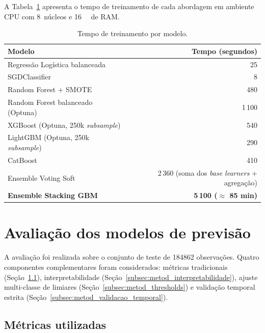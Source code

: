 A Tabela~\ref{tab:metod_tempos} apresenta o tempo de treinamento de cada abordagem em ambiente CPU com 8~núcleos e \SI{16}{\giga\byte} de RAM.

\begin{table}[h]
\centering
\caption{Tempo de treinamento por modelo.}
\label{tab:metod_tempos}
\small
\begin{tabular}{lr}
\toprule
\textbf{Modelo} & \textbf{Tempo (segundos)} \\
\midrule
Regressão Logística balanceada & 25 \\
SGDClassifier                  & 8 \\
Random Forest + SMOTE          & 480 \\
Random Forest balanceado (Optuna) & 1\,100 \\
XGBoost (Optuna, 250k \emph{subsample}) & 540 \\
LightGBM (Optuna, 250k \emph{subsample}) & 290 \\
CatBoost                       & 410 \\
Ensemble Voting Soft           & 2\,360 (soma dos \emph{base learners} + agregação) \\
\textbf{Ensemble Stacking GBM} & \textbf{5\,100 (\(\approx\) 85 min)} \\
\bottomrule
\end{tabular}
\end{table}


\section{Avaliação dos modelos de previsão}
\label{sec:metod_avaliacao}

A avaliação foi realizada sobre o conjunto de teste de \num{184862} observações. Quatro componentes complementares foram considerados: métricas tradicionais (Seção~\ref{subsec:metod_metricas}), interpretabilidade (Seção~\ref{subsec:metod_interpretabilidade}), ajuste multi-classe de limiares (Seção~\ref{subsec:metod_thresholds}) e validação temporal estrita (Seção~\ref{subsec:metod_validacao_temporal}).

\subsection{Métricas utilizadas}
\label{subsec:metod_metricas}

